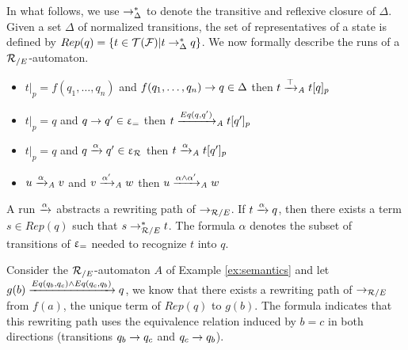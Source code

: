 \noindent 


In what follows, we use $\rightarrow^*_{\Delta}$ to denote the transitive and
reflexive closure of $\Delta$.  Given a set $\Delta$ of normalized
transitions, the set of representatives of a state is defined by
$Rep(q) = \{ t \in \mathcal{T(F)} | t \rightarrow^*_{\Delta} q\}$. We now formally describe the
runs of a ${\mathcal R_{/E}}$-automaton.


\begin{definition}
  \label{def:xrw_alpha}
  \begin{itemize}
  \item $t|_p = f(q_1, \dots, q_n)$ and $f(q_1, \dots, q_n) \rightarrow q \in \Delta$
    then $t \xrightarrow{\top}_\mathit A t[q]_p$
  \item $t|_p = q$ and $q \rightarrow q' \in \upvarepsilon_{=}$ then $t \xrightarrow{Eq(q, q')}_\mathit A t[q']_p$
  \item $t|_p = q$ and $q \xrightarrow{\alpha} q' \in \upvarepsilon_{\mathcal R}$ then $t \xrightarrow{\alpha}_\mathit A t[q']_p$ 
  \item $u \xrightarrow{\alpha}_\mathit A v$ and $v \xrightarrow{\alpha'}_\mathit A w$ then $u \xrightarrow{\alpha \land \alpha'}_\mathit A w$
  \end{itemize}
\end{definition}

\noindent
A run $\xrightarrow{\alpha}$ abstracts a rewriting path of $\rightarrow_{\mathcal R/E}$. If $t
\xrightarrow{\alpha} q$, then there exists a term $s\in Rep(q)$ such that
$s\rightarrow_{\mathcal R/E}^* t$. The formula $\alpha$ denotes the subset of transitions
of $\upvarepsilon_{=}$ needed to recognize $t$ into $q$.
\begin{example}
  Consider the ${\mathcal R_{/E}}$-automaton $A$ of Example \ref{ex:semantics} and
  let $g(b) \xrightarrow{Eq(q_b, q_c) \land Eq (q_c, q_b)} q$, we know that
  there exists a rewriting path of $\rightarrow_{\mathcal R/E}$ from $f(a)$, the unique
  term of $Rep(q)$ to $g(b)$. The formula indicates that this
  rewriting path uses the equivalence relation induced by $b = c$ in
  both directions (transitions $q_b \rightarrow q_c$ and $q_c \rightarrow q_b$).
\end{example}


